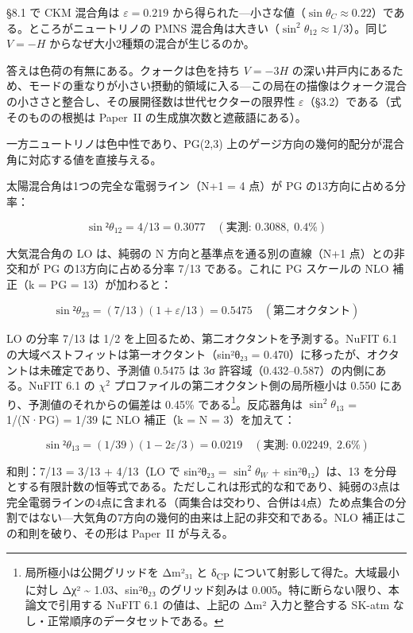 \documentclass[fontsize=11pt,paper=a4,lualatex]{jlreq}
\begin{document}
§8.1 で CKM 混合角は $\varepsilon = 0.219$ から得られた---小さな値（$\sin\theta_C \approx 0.22$）である。ところがニュートリノの PMNS 混合角は大きい（$\sin^2\theta_{12} \approx 1/3$）。同じ $V = -H$ からなぜ大小2種類の混合が生じるのか。

答えは色荷の有無にある。クォークは色を持ち $V = -3H$ の深い井戸内にあるため、モードの重なりが小さい摂動的領域に入る---この局在の描像はクォーク混合の小ささと整合し、その展開径数は世代セクターの限界性 $\varepsilon$（§3.2）である（式そのものの根拠は Paper~II の生成旗次数と遮蔽語にある）。

一方ニュートリノは色中性であり、PG(2,3) 上のゲージ方向の幾何的配分が混合角に対応する値を直接与える。

太陽混合角は1つの完全な電弱ライン（N+1 = 4 点）が PG
の13方向に占める分率：

\[\sin²θ_{12} = 4/13 = 0.3077 \quad (\text{実測: } 0.3088,\; 0.4\%)\]

大気混合角の LO は、純弱の N 方向と基準点を通る別の直線（N+1 点）との非交和が PG の13方向に占める分率 7/13 である。これに PG スケールの NLO 補正（k
= \textbar PG\textbar{} = 13）が加わると：

\[\sin²θ_{23} = (7/13)(1 + ε/13) = 0.5475 \quad (\text{第二オクタント})\]

LO の分率 7/13 は 1/2
を上回るため、第二オクタントを予測する。NuFIT 6.1 \cite{nufit} の大域ベストフィットは第一オクタント（sin²θ₂₃ = 0.470）に移ったが、オクタントは未確定であり、予測値 0.5475 は 3σ 許容域（0.432--0.587）の内側にある。NuFIT 6.1 の $\chi^2$ プロファイルの第二オクタント側の局所極小は 0.550 にあり、予測値のそれからの偏差は 0.45\% である\footnote{局所極小は公開グリッドを Δm²₃₁ と δ\textsubscript{CP} について射影して得た。大域最小に対し Δχ² \textasciitilde{} 1.03、sin²θ₂₃ のグリッド刻みは 0.005。特に断らない限り、本論文で引用する NuFIT 6.1 の値は、上記の Δm² 入力と整合する SK-atm なし・正常順序のデータセットである。}。反応器角は $\sin^2\!\theta_{13}$ = 1/(N·\textbar PG\textbar) = 1/39 に NLO
補正（k = N = 3）を加えて：

\[\sin²θ_{13} = (1/39)(1 - 2ε/3) = 0.0219 \quad (\text{実測: } 0.02249,\; 2.6\%)\]

和則：7/13 = 3/13 + 4/13（LO で sin²θ₂₃ = $\sin^2\!\theta_W$ + sin²θ₁₂）は、13 を分母とする有限計数の恒等式である。ただしこれは形式的な和であり、純弱の3点は完全電弱ラインの4点に含まれる（両集合は交わり、合併は4点）ため点集合の分割ではない---大気角の7方向の幾何的由来は上記の非交和である。NLO 補正はこの和則を破り、その形は Paper~II が与える。
\end{document}
